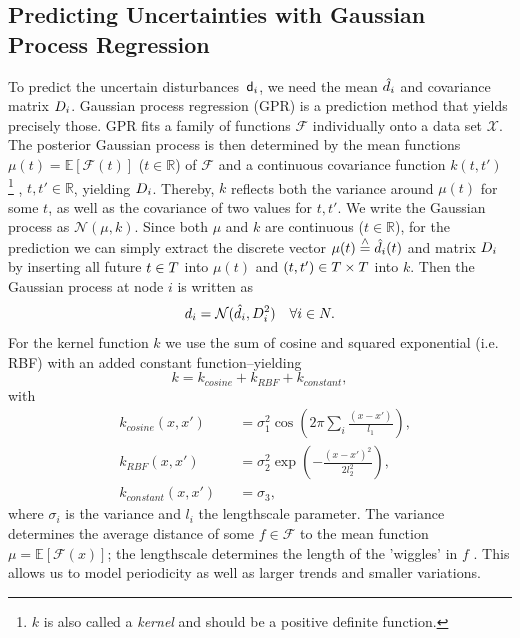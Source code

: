 \documentclass[final,3p,times,twocolumn]{elsarticle}  %
\begin{document}
\subsection{Predicting Uncertainties with Gaussian Process Regression}
\label{sec:GPR}
%
To predict the uncertain disturbances~$\mathsf{d}_i$, we need the mean $\hat{d}_i$ and covariance matrix $\Load_i$.
Gaussian process regression (GPR) is a prediction method that yields precisely those.
GPR fits a family of functions $\mathcal{F}$ individually onto a data set $\mathcal{X}$. The posterior Gaussian process is then determined by the mean functions $\mu(t) = \mathbb{E}[\mathcal{F}(t)]$ ($t\in\mathbb{R}$) of $\mathcal{F}$ and a continuous covariance function $k(t,t')$
\footnote{$k$ is also called a \textit{kernel} and should be a positive definite function.}
, $t,t'\in\mathbb{R}$, yielding $\Load_i$.
Thereby, $k$ reflects both the variance around $\mu(t)$ for some $t$, as well as the covariance of two values for $t,t'$. We write the Gaussian process as $\mathcal{N}(\mu,k)$.
%
%
Since both $\mu$ and $k$ are continuous ($t\in\mathbb{R}$), for the prediction we can simply extract the discrete vector $\mu(t)\stackrel{\wedge}{=}\hat{d}_i(t)$ and matrix $\Load_i$ by inserting all future $t\in T$ into $\mu(t)$ and $(t,t')\in T\times T$ into $k$.
Then the Gaussian process at node $i$ is written as
\begin{equation}
    d_i = \mathcal{N}(\hat\load_i,\Load_i^2) \quad \forall i \in \nbus.
\end{equation}
%
For the kernel function $k$ we use the sum of cosine and squared exponential (i.e. RBF) with an added constant function--yielding
\begin{equation}
\label{eq:kernel}
    k = k_{cosine} + k_{RBF} + k_{constant},
\end{equation}
with
\begin{align*}
    &k_{cosine}(x,x') & &= \sigma_{1}^2\cos\left(2\pi \sum_i \frac{(x-x')}{l_{1}}\right), \\
    &k_{RBF}(x,x')    & &= \sigma_{2}^2 \exp{\left(-\frac{(x-x')^2}{2l_{2}^2}\right)}, \\
    &k_{constant}(x,x') & &= \sigma_{3},
\end{align*}
where $\sigma_i$ is the variance and $l_i$ the lengthscale parameter. The variance determines the average distance of some $f\in\mathcal{F}$ to the mean function $\mu=\mathbb{E}[\mathcal{F}(x)]$; the lengthscale determines the length of the 'wiggles' in $f$ \cite{duvenaud_automatic_nodate}. This allows us to model periodicity as well as larger trends and smaller variations.
\end{document}
